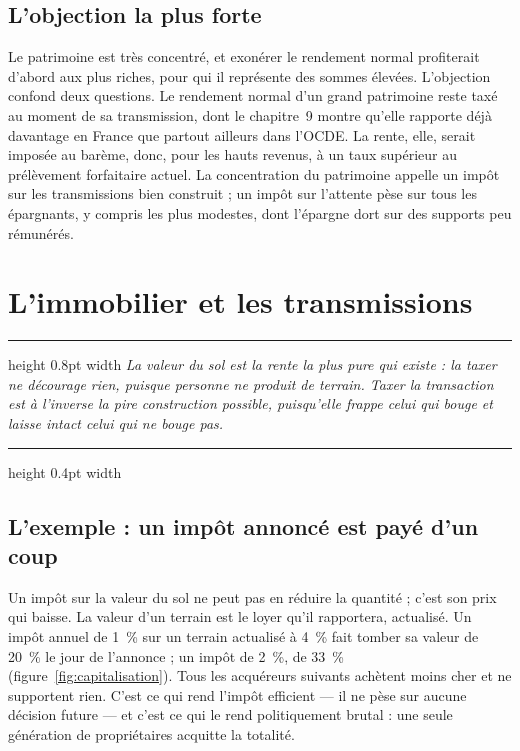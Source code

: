 \documentclass[11pt,a4paper]{article}
\newenvironment{argument}
  {\par\smallskip\noindent\begin{minipage}{\linewidth}%
   \color{encre}\hrule height 0.8pt width \linewidth \vspace{7pt}%
   \large\itshape}
  {\par\vspace{7pt}\hrule height 0.4pt width \linewidth\end{minipage}\par\medskip}
\begin{document}
\subsection{L'objection la plus forte}

Le patrimoine est très concentré, et exonérer le rendement normal profiterait d'abord aux plus
riches, pour qui il représente des sommes élevées. L'objection confond deux questions. Le rendement
normal d'un grand patrimoine reste taxé au moment de sa transmission, dont le chapitre~9 montre
qu'elle rapporte déjà davantage en France que partout ailleurs dans l'OCDE. La rente, elle,
serait imposée au barème, donc, pour les hauts revenus, à un taux supérieur au prélèvement
forfaitaire actuel. La concentration du patrimoine appelle un impôt sur les transmissions bien
construit ; un impôt sur l'attente pèse sur tous les épargnants, y compris les plus modestes, dont
l'épargne dort sur des supports peu rémunérés.

\section{L'immobilier et les transmissions}

\begin{argument}
La valeur du sol est la rente la plus pure qui existe : la taxer ne décourage rien, puisque
personne ne produit de terrain. Taxer la transaction est à l'inverse la pire construction
possible, puisqu'elle frappe celui qui bouge et laisse intact celui qui ne bouge pas.
\end{argument}

\subsection{L'exemple : un impôt annoncé est payé d'un coup}

Un impôt sur la valeur du sol ne peut pas en réduire la quantité ; c'est son prix qui baisse. La
valeur d'un terrain est le loyer qu'il rapportera, actualisé. Un impôt annuel de 1~\% sur un terrain
actualisé à 4~\% fait tomber sa valeur de 20~\% le jour de l'annonce ; un impôt de 2~\%, de 33~\%
(figure~\ref{fig:capitalisation}). Tous les acquéreurs suivants achètent moins cher et ne
supportent rien. C'est ce qui rend l'impôt efficient --- il ne pèse sur aucune décision future ---
et c'est ce qui le rend politiquement brutal : une seule génération de propriétaires acquitte la
totalité.
\end{document}
